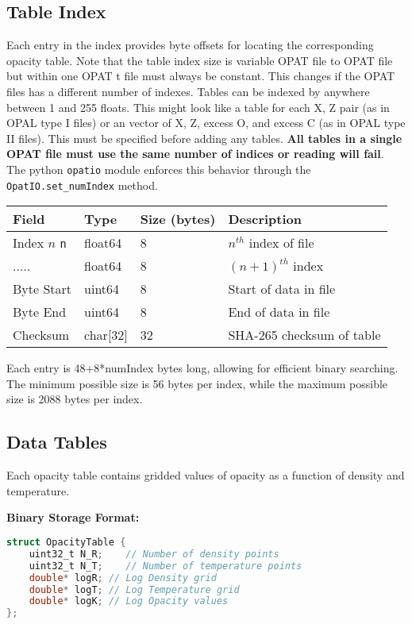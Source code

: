 \documentclass{article}
\begin{document}
\subsection{Table Index}
Each entry in the index provides byte offsets for locating the corresponding
opacity table. Note that the table index size is variable OPAT file to OPAT
file but within one OPAT t file must always be constant. This changes if the
OPAT files has a different number of indexes. Tables can be indexed by anywhere
between 1 and 255 floats. This might look like a table for each X, Z pair (as
in OPAL type I files) or an vector of X, Z, excess O, and excess C (as in OPAL
type II files). This must be specified before adding any tables. \textbf{All
tables in a single OPAT file must use the same number of indices or reading
will fail}. The python \texttt{opatio} module enforces this behavior through
the \texttt{OpatIO.set\_numIndex} method.
\begin{longtable}{|l|l|l|l|}
\hline
\textbf{Field} & \textbf{Type} & \textbf{Size (bytes)} & \textbf{Description} \\
\hline
Index $n$ \texttt{n} & float64 & 8 & $n^{th}$ index of file \\
..... & float64 & 8 & $(n+1)^{th}$ index \\
Byte Start & uint64 & 8 & Start of data in file \\
Byte End & uint64 & 8 & End of data in file \\
Checksum & char[32] & 32 & SHA-265 checksum of table \\
\hline
\end{longtable}

Each entry is 48+8*numIndex bytes long, allowing for efficient binary
searching. The minimum possible size is 56 bytes per index, while the maximum
possible size is 2088 bytes per index.

\subsection{Data Tables}
Each opacity table contains gridded values of opacity as a function of density and temperature.

\textbf{Binary Storage Format:}

\begin{lstlisting}[language=C, basicstyle=\ttfamily]
struct OpacityTable {
    uint32_t N_R;    // Number of density points
    uint32_t N_T;    // Number of temperature points
    double* logR; // Log Density grid
    double* logT; // Log Temperature grid
    double* logK; // Log Opacity values
};
\end{lstlisting}
\end{document}

